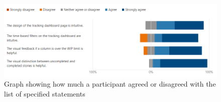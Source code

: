 \documentclass[l4proj.tex]{subfiles}
\begin{document}
\begin{figure}[h!]
\begin{center}
\includegraphics[scale=0.5]{dissertation/images/EvaluationTrackingStatementsGraph.png}
\caption{Graph showing how much a participant agreed or disagreed with the list of specified statements}
\label{fig:tracking statement feedback} 
\end{center}
\end{figure}
\end{document}
